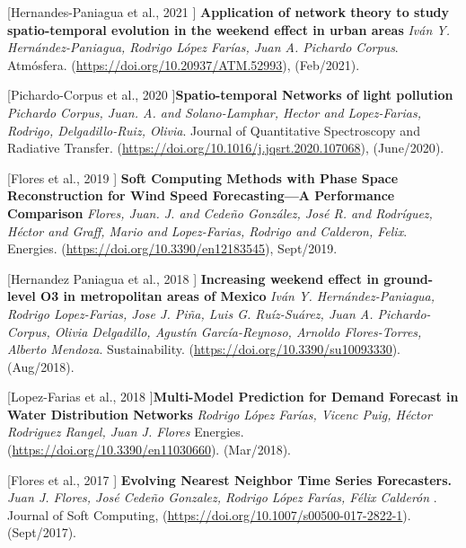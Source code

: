 \documentclass[10pt]{article}
\newenvironment{innerlist}[1][\enskip\textbullet]%
        {\begin{compactitem}[#1]}{\end{compactitem}}
\begin{document}
\begin{innerlist}
\item [[Hernandes-Paniagua et al., 2021]] \textbf{Application of network theory to study spatio-temporal evolution in
the weekend effect in urban areas} \textit{Iván Y. Hernández-Paniagua, Rodrigo López Farías, Juan A. Pichardo Corpus}. Atmósfera. (\url{https://doi.org/10.20937/ATM.52993}), (Feb/2021).

\item [[Pichardo-Corpus et al., 2020]]\textbf{Spatio-temporal Networks of light pollution} \textit{{Pichardo Corpus, Juan. A. and Solano-Lamphar, Hector and Lopez-Farias, Rodrigo, Delgadillo-Ruiz, Olivia}}. {Journal of Quantitative Spectroscopy and Radiative Transfer}. (\url{https://doi.org/10.1016/j.jqsrt.2020.107068}), ({June/2020}).

\item [[Flores et al., 2019]] \textbf{Soft Computing Methods with Phase Space Reconstruction for Wind Speed Forecasting—A Performance Comparison} \textit{{Flores, Juan. J. and Cedeño González, José R. and Rodríguez, Héctor and Graff, Mario and Lopez-Farias, Rodrigo and Calderon, Felix}}. {Energies}. (\url{https://doi.org/10.3390/en12183545}), {Sept/2019}.

\item [[Hernandez Paniagua et al., 2018]] \textbf{Increasing weekend effect in ground-level O3 in metropolitan areas of Mexico} \textit{Iván Y. Hernández-Paniagua, Rodrigo Lopez-Farias, Jose J. Piña, Luis G. Ruíz-Suárez, Juan A. Pichardo-Corpus, Olivia Delgadillo, Agustín García-Reynoso, Arnoldo Flores-Torres, Alberto Mendoza}. {Sustainability}. (\url{https://doi.org/10.3390/su10093330}). ({Aug/2018}).

\item [[Lopez-Farias et al., 2018]]\textbf{Multi-Model Prediction for Demand Forecast in
Water Distribution Networks} \textit{Rodrigo López Farías, Vicenc Puig, Héctor Rodriguez Rangel, Juan J. Flores} {Energies}. (\url{https://doi.org/10.3390/en11030660}). ({Mar/2018}).

\item  [[Flores et al., 2017]] \textbf{Evolving Nearest Neighbor Time Series Forecasters.} \textit{Juan J. Flores, José Cede\~no Gonzalez, Rodrigo López Farías, Félix Calderón }.  {Journal of Soft Computing},
(\url{https://doi.org/10.1007/s00500-017-2822-1}). (Sept/2017).


\end{innerlist}
\end{document}
